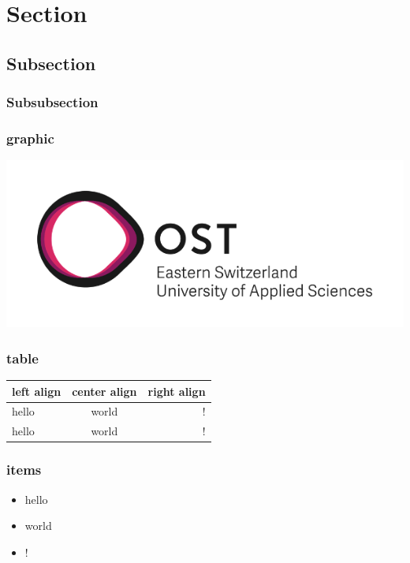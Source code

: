 \section{Section}



\subsection{Subsection}


\subsubsection{Subsubsection}
\lipsum

\subsubsection{graphic}
\begin{center}
    \includegraphics[width=\linewidth]{./img/OST_Logo.png}
\end{center}
\vspace{-8pt}

\subsubsection{table}
    \begin{center}
    \begin{tabular}{l | c | r}
        \hline
        left align & center align & right align\\ \hline
        \hline
        hello & world & !\\ \hline
        hello & world & !\\ \hline
    \end{tabular}
    \end{center}

\subsubsection{items}
\begin{itemize}
    \item hello
    \item world
    \item !
\end{itemize}

